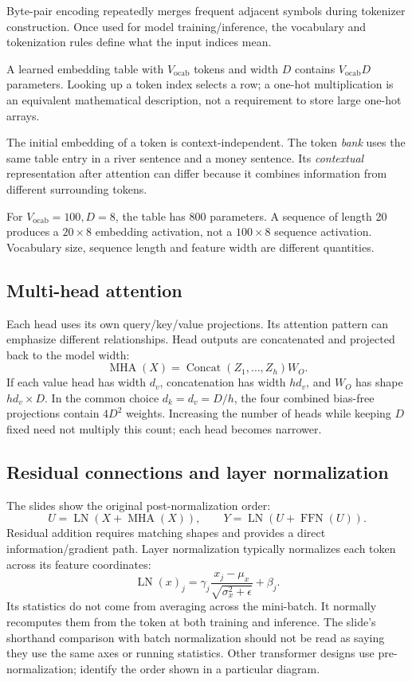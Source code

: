 \documentclass[11pt]{article}
\begin{document}
Byte-pair encoding repeatedly merges frequent adjacent symbols during tokenizer construction. Once used for model training/inference, the vocabulary and tokenization rules define what the input indices mean.

A learned embedding table with $V_{\mathrm{ocab}}$ tokens and width $D$ contains $V_{\mathrm{ocab}}D$ parameters. Looking up a token index selects a row; a one-hot multiplication is an equivalent mathematical description, not a requirement to store large one-hot arrays.

The initial embedding of a token is context-independent. The token \emph{bank} uses the same table entry in a river sentence and a money sentence. Its \emph{contextual} representation after attention can differ because it combines information from different surrounding tokens.

For $V_{\mathrm{ocab}}=100,D=8$, the table has 800 parameters. A sequence of length 20 produces a $20\times8$ embedding activation, not a $100\times8$ sequence activation. Vocabulary size, sequence length and feature width are different quantities.

\subsection{Multi-head attention}
Each head uses its own query/key/value projections. Its attention pattern can emphasize different relationships. Head outputs are concatenated and projected back to the model width:
\[
\operatorname{MHA}(X)=
\operatorname{Concat}(Z_1,\ldots,Z_h)W_O.
\]
If each value head has width $d_v$, concatenation has width $hd_v$, and $W_O$ has shape $hd_v\times D$. In the common choice $d_k=d_v=D/h$, the four combined bias-free projections contain $4D^2$ weights. Increasing the number of heads while keeping $D$ fixed need not multiply this count; each head becomes narrower.

\subsection{Residual connections and layer normalization}
The slides show the original post-normalization order:
\[
U=\operatorname{LN}(X+\operatorname{MHA}(X)),\qquad
Y=\operatorname{LN}(U+\operatorname{FFN}(U)).
\]
Residual addition requires matching shapes and provides a direct information/gradient path. Layer normalization typically normalizes each token across its feature coordinates:
\[
\operatorname{LN}(x)_j=\gamma_j
\frac{x_j-\mu_x}{\sqrt{\sigma_x^2+\epsilon}}+\beta_j.
\]
Its statistics do not come from averaging across the mini-batch. It normally recomputes them from the token at both training and inference. The slide's shorthand comparison with batch normalization should not be read as saying they use the same axes or running statistics. Other transformer designs use pre-normalization; identify the order shown in a particular diagram.
\end{document}
